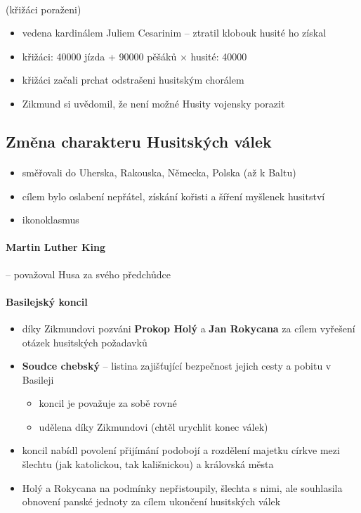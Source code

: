 \paragraph{} (křižáci poraženi)
\begin{itemize}
\item vedena kardinálem Juliem Cesarinim -- ztratil klobouk \ra husité ho získal
\item křižáci: 40000 jízda + 90000 pěšáků $\times$ husité: 40000
\item křižáci začali prchat odstrašeni husitským chorálem
\item[\ra] Zikmund si uvědomil, že není možné Husity vojensky porazit
\end{itemize}

\subsection{Změna charakteru Husitských válek}
\paragraph{}
\begin{itemize}
\item směřovali do Uherska, Rakouska, Německa, Polska (až k Baltu)
\item cílem bylo oslabení nepřátel, získání kořisti a šíření myšlenek husitství
\item ikonoklasmus
\end{itemize}

\paragraph{Martin Luther King} -- považoval Husa za svého předchůdce

\paragraph{Basilejský koncil}
\begin{itemize}
\item díky Zikmundovi pozváni \textbf{Prokop Holý} a \textbf{Jan Rokycana} za cílem vyřešení otázek husitských požadavků
\item \textbf{Soudce chebský} -- listina zajišťující bezpečnost jejich cesty a pobitu v Basileji
\begin{itemize}
\item koncil je považuje za sobě rovné
\item udělena díky Zikmundovi (chtěl urychlit konec válek)
\end{itemize}
\item koncil nabídl povolení přijímání podobojí a rozdělení majetku církve mezi šlechtu (jak katolickou, tak kališnickou) a královská města 
\item Holý a Rokycana na podmínky nepřistoupily, šlechta s nimi, ale souhlasila \ra obnovení panské jednoty za cílem ukončení husitských válek
\end{itemize}

